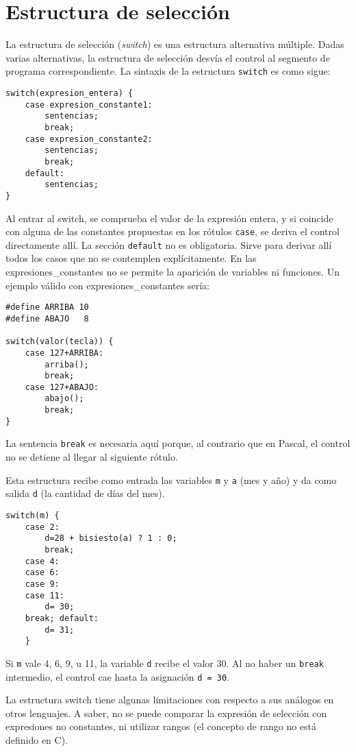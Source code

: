 \section{Estructura de selección}

La estructura de selección (\textit{switch}) es una estructura alternativa múltiple. Dadas varias alternativas, la estructura de selección desvía el control al
segmento de programa correspondiente. La sintaxis de la estructura \texttt{switch} es
como sigue:
\begin{lstlisting}
switch(expresion_entera) {
    case expresion_constante1:
        sentencias;
        break;
    case expresion_constante2:
        sentencias;
        break;
    default:
        sentencias;
}
\end{lstlisting}
Al entrar al switch, se comprueba el valor de la expresión entera, y si
coincide con alguna de las constantes propuestas en los rótulos \texttt{case}, se deriva
el control directamente allí. La sección \texttt{default} no es obligatoria. Sirve para
derivar allí todos los casos que no se contemplen explícitamente.
En las expresiones\_constantes no se permite la aparición de variables ni
funciones. Un ejemplo válido con expresiones\_constantes sería:

\begin{lstlisting}
#define ARRIBA 10
#define ABAJO   8

switch(valor(tecla)) {
    case 127+ARRIBA:
        arriba();
        break;
    case 127+ABAJO:
        abajo();
        break;
}
\end{lstlisting}
La sentencia \texttt{break}
 es necesaria aquí porque, al contrario que en Pascal, el
control no se detiene al llegar al siguiente rótulo.

\begin{ejemplo}
Esta estructura recibe como entrada las variables \texttt{m} y \texttt{a} (mes y año) y da como
salida \texttt{d} (la cantidad de días del mes).

\begin{lstlisting}
switch(m) {
    case 2:
        d=28 + bisiesto(a) ? 1 : 0;
        break;
    case 4:
    case 6:
    case 9:
    case 11:
        d= 30;
    break; default:
        d= 31;
    }
\end{lstlisting}
Si \texttt{m} vale 4, 6, 9, u 11, la variable \texttt{d} recibe el valor 30. Al no haber un \texttt{break}
intermedio, el control cae hasta la asignación \lstinline{d = 30}.

La estructura switch tiene algunas limitaciones con respecto a sus análogos en otros lenguajes. A saber, no se puede comparar la expresión de selección con
expresiones no constantes, ni utilizar rangos (el concepto de rango no está
definido en C).
\end{ejemplo}

